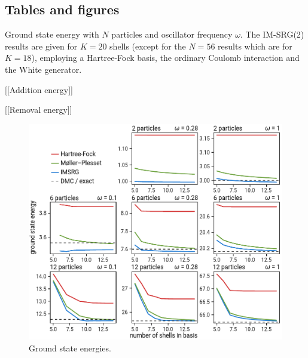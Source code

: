\subsection{Tables and figures}

\begin{table}
  \centering
  \caption{Ground state energy with $N$ particles and oscillator frequency $\omega$. The IM-SRG(2) results are given for $K=20$ shells (except for the $N=56$ results which are for $K=18$), employing a Hartree-Fock basis, the ordinary Coulomb interaction and the White generator.}
  \label{tab:SRGDMC-R20}
  
\end{table}

\begin{table}
  \centering
  \caption{[[Addition energy]]}
  
\end{table}

\begin{table}
  \centering
  \caption{[[Removal energy]]}
  
\end{table}

\begin{figure}
  \centering
  \includegraphics[width=0.8\linewidth]{fig-gs}
  \caption{Ground state energies.}
  \label{fig:gs}
\end{figure}

